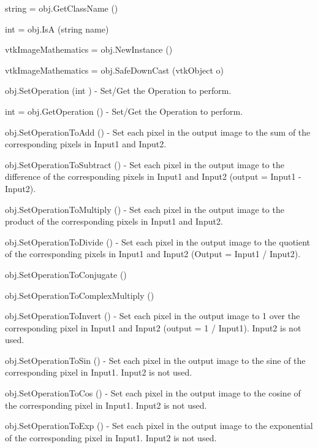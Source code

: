 \begin{DoxyItemize}
\item {\ttfamily string = obj.\-Get\-Class\-Name ()}  
\item {\ttfamily int = obj.\-Is\-A (string name)}  
\item {\ttfamily vtk\-Image\-Mathematics = obj.\-New\-Instance ()}  
\item {\ttfamily vtk\-Image\-Mathematics = obj.\-Safe\-Down\-Cast (vtk\-Object o)}  
\item {\ttfamily obj.\-Set\-Operation (int )} -\/ Set/\-Get the Operation to perform.  
\item {\ttfamily int = obj.\-Get\-Operation ()} -\/ Set/\-Get the Operation to perform.  
\item {\ttfamily obj.\-Set\-Operation\-To\-Add ()} -\/ Set each pixel in the output image to the sum of the corresponding pixels in Input1 and Input2.  
\item {\ttfamily obj.\-Set\-Operation\-To\-Subtract ()} -\/ Set each pixel in the output image to the difference of the corresponding pixels in Input1 and Input2 (output = Input1 -\/ Input2).  
\item {\ttfamily obj.\-Set\-Operation\-To\-Multiply ()} -\/ Set each pixel in the output image to the product of the corresponding pixels in Input1 and Input2.  
\item {\ttfamily obj.\-Set\-Operation\-To\-Divide ()} -\/ Set each pixel in the output image to the quotient of the corresponding pixels in Input1 and Input2 (Output = Input1 / Input2).  
\item {\ttfamily obj.\-Set\-Operation\-To\-Conjugate ()}  
\item {\ttfamily obj.\-Set\-Operation\-To\-Complex\-Multiply ()}  
\item {\ttfamily obj.\-Set\-Operation\-To\-Invert ()} -\/ Set each pixel in the output image to 1 over the corresponding pixel in Input1 and Input2 (output = 1 / Input1). Input2 is not used.  
\item {\ttfamily obj.\-Set\-Operation\-To\-Sin ()} -\/ Set each pixel in the output image to the sine of the corresponding pixel in Input1. Input2 is not used.  
\item {\ttfamily obj.\-Set\-Operation\-To\-Cos ()} -\/ Set each pixel in the output image to the cosine of the corresponding pixel in Input1. Input2 is not used.  
\item {\ttfamily obj.\-Set\-Operation\-To\-Exp ()} -\/ Set each pixel in the output image to the exponential of the corresponding pixel in Input1. Input2 is not used.  

\end{DoxyItemize}
